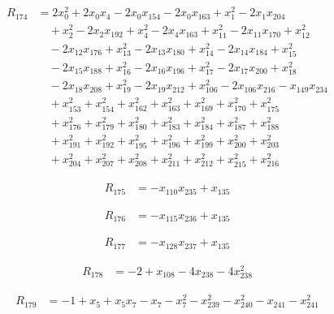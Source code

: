\begin{align*}
R_{174} &= 2 x_{0}^{2} +2 x_{0} x_{4} -2 x_{0} x_{154} -2 x_{0} x_{163} +x_{1}^{2} -2 x_{1} x_{204} \\
&\quad +x_{2}^{2} -2 x_{2} x_{192} +x_{4}^{2} -2 x_{4} x_{163} +x_{11}^{2} -2 x_{11} x_{170} +x_{12}^{2} \\
&\quad -2 x_{12} x_{176} +x_{13}^{2} -2 x_{13} x_{180} +x_{14}^{2} -2 x_{14} x_{184} +x_{15}^{2} \\
&\quad -2 x_{15} x_{188} +x_{16}^{2} -2 x_{16} x_{196} +x_{17}^{2} -2 x_{17} x_{200} +x_{18}^{2} \\
&\quad -2 x_{18} x_{208} +x_{19}^{2} -2 x_{19} x_{212} +x_{106}^{2} -2 x_{106} x_{216} -x_{149} x_{234} \\
&\quad +x_{153}^{2} +x_{154}^{2} +x_{162}^{2} +x_{163}^{2} +x_{169}^{2} +x_{170}^{2} +x_{175}^{2} \\
&\quad +x_{176}^{2} +x_{179}^{2} +x_{180}^{2} +x_{183}^{2} +x_{184}^{2} +x_{187}^{2} +x_{188}^{2} \\
&\quad +x_{191}^{2} +x_{192}^{2} +x_{195}^{2} +x_{196}^{2} +x_{199}^{2} +x_{200}^{2} +x_{203}^{2} \\
&\quad +x_{204}^{2} +x_{207}^{2} +x_{208}^{2} +x_{211}^{2} +x_{212}^{2} +x_{215}^{2} +x_{216}^{2}
\end{align*}

\begin{align*}
R_{175} &= -x_{110} x_{235} +x_{135}
\end{align*}

\begin{align*}
R_{176} &= -x_{115} x_{236} +x_{135}
\end{align*}

\begin{align*}
R_{177} &= -x_{128} x_{237} +x_{135}
\end{align*}

\begin{align*}
R_{178} &= -2 +x_{108} -4 x_{238} -4 x_{238}^{2}
\end{align*}

\begin{align*}
R_{179} &= -1 +x_{5} +x_{5} x_{7} -x_{7} -x_{7}^{2} -x_{239}^{2} -x_{240}^{2} -x_{241} -x_{241}^{2}
\end{align*}

